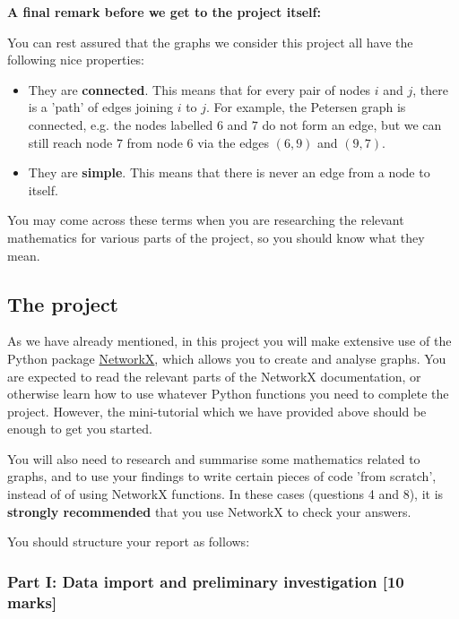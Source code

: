 \documentclass[11pt]{article}
\providecommand{\tightlist}{%
      \setlength{\itemsep}{0pt}\setlength{\parskip}{0pt}}
\begin{document}
\textbf{A final remark before we get to the project itself:}

You can rest assured that the graphs we consider this project all have
the following nice properties:

\begin{itemize}
\tightlist
\item
  They are \textbf{connected}. This means that for every pair of nodes
  \(i\) and \(j\), there is a 'path' of edges joining \(i\) to \(j\).
  For example, the Petersen graph is connected, e.g. the nodes labelled
  \(6\) and \(7\) do not form an edge, but we can still reach node \(7\)
  from node \(6\) via the edges \((6,9)\) and \((9,7)\).
\item
  They are \textbf{simple}. This means that there is never an edge from
  a node to itself.
\end{itemize}

You may come across these terms when you are researching the relevant
mathematics for various parts of the project, so you should know what
they mean.

    \subsection{The project}\label{the-project}

As we have already mentioned, in this project you will make extensive
use of the Python package \href{https://networkx.github.io/}{NetworkX},
which allows you to create and analyse graphs. You are expected to read
the relevant parts of the NetworkX documentation, or otherwise learn how
to use whatever Python functions you need to complete the project.
However, the mini-tutorial which we have provided above should be enough
to get you started.

You will also need to research and summarise some mathematics related to
graphs, and to use your findings to write certain pieces of code 'from
scratch', instead of of using NetworkX functions. In these cases
(questions 4 and 8), it is \textbf{strongly recommended} that you use
NetworkX to check your answers.

You should structure your report as follows:

\subsubsection{Part I: Data import and preliminary investigation {[}10
marks{]}}\label{part-i-data-import-and-preliminary-investigation-10-marks}
\end{document}
